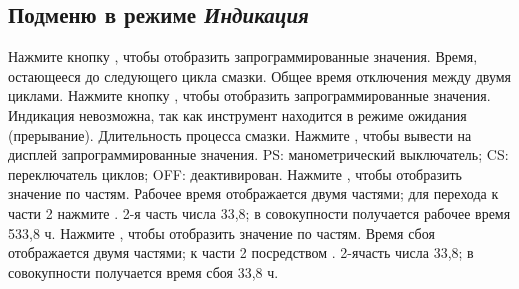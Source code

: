 \subsection{Подменю в режиме {\em Индикация}}
%
\vskip -9pt
%
\adaptlayout [height=+5mm]
%
\startcolumns[balance=no]\stdfontsemicn
%
\startSymVogel
{}
\SymVogel
{} Нажмите кнопку , чтобы отобразить запрограммированные значения.
\stopSymVogel
%
\startSymVogel
\externalfigure[vogel_068][width=26mm]
\SymVogel
{} Время, остающееся до следующего цикла смазки.
\stopSymVogel
%
\startSymVogel
\externalfigure[vogel_090][width=26mm]
\SymVogel
{} Общее время отключения между двумя циклами.
\stopSymVogel
%
\startSymVogel
{}
\SymVogel
{} Нажмите кнопку , чтобы отобразить запрограммированные значения.
\stopSymVogel
%
\startSymVogel
{}
\SymVogel
{} Индикация невозможна, так как инструмент находится в режиме ожидания (прерывание).
\stopSymVogel
%
\startSymVogel
\externalfigure[vogel_026][width=26mm]
\SymVogel
{} Длительность процесса смазки.
\stopSymVogel
%
\startSymVogel
{}
\SymVogel
{} Нажмите , чтобы вывести на дисплей запрограммированные значения.
\stopSymVogel
%
\startSymVogel
{}
\SymVogel
{} \hfill PS: манометрический выключатель;\crlf
CS: переключатель циклов; OFF: деактивирован.
\stopSymVogel
%
\startSymVogel
\externalfigure[vogel_0h][width=26mm]
\SymVogel
{} Нажмите , чтобы отобразить значение по частям.
\stopSymVogel
%
\startSymVogel
\externalfigure[vogel_005][width=26mm]
\SymVogel
{} Рабочее время отображается двумя частями; для перехода к части 2 нажмите .
\stopSymVogel
%
\startSymVogel
\externalfigure[vogel_338][width=26mm]
\SymVogel
{} 2-я часть числа 33,8; в совокупности получается рабочее время 533,8 ч.
\stopSymVogel
%
\startSymVogel
\externalfigure[vogel_fh][width=26mm]
\SymVogel
{} Нажмите , чтобы отобразить значение по частям.
\stopSymVogel
%
\startSymVogel
\externalfigure[vogel_000][width=26mm]
\SymVogel
{} Время сбоя отображается двумя частями;\crlf
к части 2 посредством .
\stopSymVogel
%
\startSymVogel
\externalfigure[vogel_338][width=26mm]
\SymVogel
{} 2-ячасть числа 33,8; в совокупности получается время сбоя 33,8 ч.
\stopSymVogel
%
\stopcolumns
\stopsection
\page [yes]
